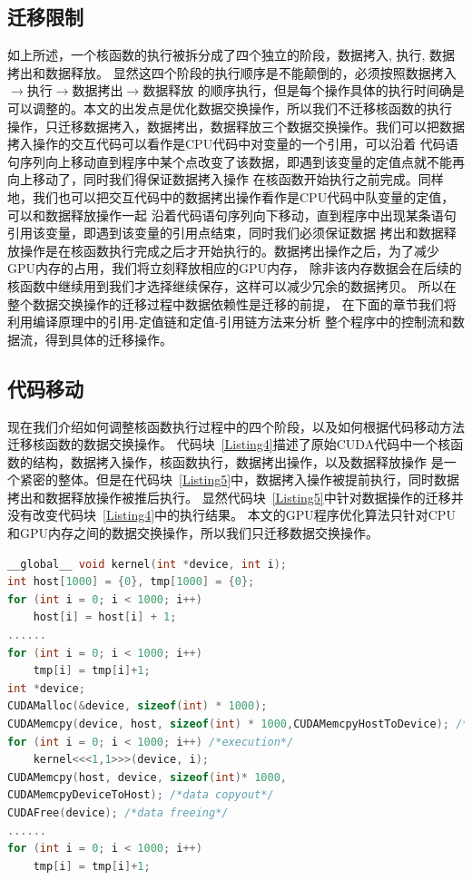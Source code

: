 \subsection{迁移限制}
如上所述，一个核函数的执行被拆分成了四个独立的阶段，数据拷入, 执行, 数据拷出和数据释放。
显然这四个阶段的执行顺序是不能颠倒的，必须按照数据拷入$\rightarrow$执行$\rightarrow$数据拷出$\rightarrow$数据释放
的顺序执行，但是每个操作具体的执行时间确是可以调整的。本文的出发点是优化数据交换操作，所以我们不迁移核函数的执行
操作，只迁移数据拷入，数据拷出，数据释放三个数据交换操作。我们可以把数据拷入操作的交互代码可以看作是CPU代码中对变量的一个引用，可以沿着
代码语句序列向上移动直到程序中某个点改变了该数据，即遇到该变量的定值点就不能再向上移动了，同时我们得保证数据拷入操作
在核函数开始执行之前完成。同样地，我们也可以把交互代码中的数据拷出操作看作是CPU代码中队变量的定值，可以和数据释放操作一起
沿着代码语句序列向下移动，直到程序中出现某条语句引用该变量，即遇到该变量的引用点结束，同时我们必须保证数据
拷出和数据释放操作是在核函数执行完成之后才开始执行的。数据拷出操作之后，为了减少GPU内存的占用，我们将立刻释放相应的GPU内存，
除非该内存数据会在后续的核函数中继续用到我们才选择继续保存，这样可以减少冗余的数据拷贝。
所以在整个数据交换操作的迁移过程中数据依赖性是迁移的前提，
在下面的章节我们将利用编译原理中的引用-定值链和定值-引用链方法来分析
整个程序中的控制流和数据流，得到具体的迁移操作。
\subsection{代码移动}
现在我们介绍如何调整核函数执行过程中的四个阶段，以及如何根据代码移动方法迁移核函数的数据交换操作。
代码块~\ref{Listing4}描述了原始CUDA代码中一个核函数的结构，数据拷入操作，核函数执行，数据拷出操作，以及数据释放操作
是一个紧密的整体。但是在代码块~\ref{Listing5}中，数据拷入操作被提前执行，同时数据拷出和数据释放操作被推后执行。
显然代码块~\ref{Listing5}中针对数据操作的迁移并没有改变代码块~\ref{Listing4}中的执行结果。
本文的GPU程序优化算法只针对CPU和GPU内存之间的数据交换操作，所以我们只迁移数据交换操作。
\newpage
\begin{lstlisting}[label=Listing4,caption=原始CUDA代码,language=C, keywordstyle=\color{blue!70},commentstyle=\color{red!50!green!50!blue!50},frame=shadowbox, rulesepcolor=\color{red!20!green!20!blue!20}] 
__global__ void kernel(int *device, int i);
int host[1000] = {0}, tmp[1000] = {0};
for (int i = 0; i < 1000; i++)
    host[i] = host[i] + 1;
......
for (int i = 0; i < 1000; i++)
    tmp[i] = tmp[i]+1;
int *device;
CUDAMalloc(&device, sizeof(int) * 1000);
CUDAMemcpy(device, host, sizeof(int) * 1000,CUDAMemcpyHostToDevice); /*data copyin*/
for (int i = 0; i < 1000; i++) /*execution*/
    kernel<<<1,1>>>(device, i);
CUDAMemcpy(host, device, sizeof(int)* 1000,
CUDAMemcpyDeviceToHost); /*data copyout*/
CUDAFree(device); /*data freeing*/
......
for (int i = 0; i < 1000; i++)
    tmp[i] = tmp[i]+1;
\end{lstlisting}

